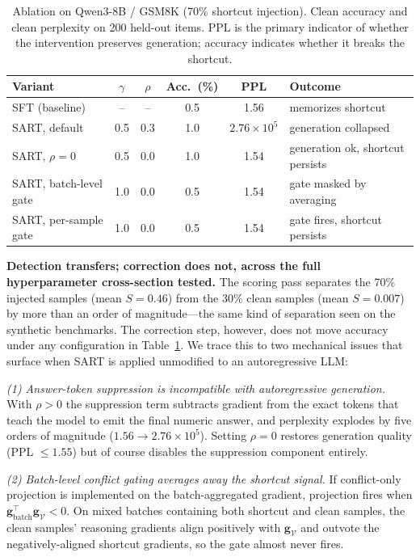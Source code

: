 \begin{table}[h]
\centering
\caption{Ablation on Qwen3-8B / GSM8K (70\% shortcut injection). Clean accuracy and clean perplexity on 200 held-out items. PPL is the primary indicator of whether the intervention preserves generation; accuracy indicates whether it breaks the shortcut.}
\label{tab:llm_transfer}
\small
\begin{tabular}{lccccl}
\toprule
\textbf{Variant} & $\gamma$ & $\rho$ & \textbf{Acc.\ (\%)} & \textbf{PPL} & \textbf{Outcome} \\
\midrule
SFT (baseline)                          & --  & --  & 0.5 & 1.56                 & memorizes shortcut \\
SART, default                           & 0.5 & 0.3 & 1.0 & $2.76{\times}10^{5}$ & generation collapsed \\
SART, $\rho{=}0$                        & 0.5 & 0.0 & 1.0 & 1.54                 & generation ok, shortcut persists \\
SART, batch-level gate                  & 1.0 & 0.0 & 0.5 & 1.54                 & gate masked by averaging \\
SART, per-sample gate                   & 1.0 & 0.0 & 0.5 & 1.54                 & gate fires, shortcut persists \\
\bottomrule
\end{tabular}
\end{table}

\textbf{Detection transfers; correction does not, across the full hyperparameter cross-section tested.} The scoring pass separates the 70\% injected samples (mean $S = 0.46$) from the 30\% clean samples (mean $S = 0.007$) by more than an order of magnitude---the same kind of separation seen on the synthetic benchmarks. The correction step, however, does not move accuracy under any configuration in Table~\ref{tab:llm_transfer}. We trace this to two mechanical issues that surface when SART is applied unmodified to an autoregressive LLM:

\emph{(1) Answer-token suppression is incompatible with autoregressive generation.} With $\rho > 0$ the suppression term subtracts gradient from the exact tokens that teach the model to emit the final numeric answer, and perplexity explodes by five orders of magnitude ($1.56 \to 2.76\times 10^{5}$). Setting $\rho = 0$ restores generation quality (PPL $\leq 1.55$) but of course disables the suppression component entirely.

\emph{(2) Batch-level conflict gating averages away the shortcut signal.} If conflict-only projection is implemented on the batch-aggregated gradient, projection fires when $\mathbf{g}_{\mathrm{batch}}^\top \mathbf{g}_{\mathcal{V}} < 0$. On mixed batches containing both shortcut and clean samples, the clean samples' reasoning gradients align positively with $\mathbf{g}_{\mathcal{V}}$ and outvote the negatively-aligned shortcut gradients, so the gate almost never fires.

